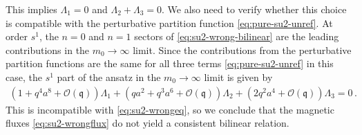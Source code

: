 \documentclass[11pt, a4paper]{article}
\theoremstyle{definition}
\begin{document}
This implies $ \Lambda_1=0 $ and $ \Lambda_2+\Lambda_3=0 $. We also need to verify whether this choice is compatible with the perturbative partition function \eqref{eq:pure-su2-unref}. At order $ s^1 $, the $ n=0 $ and $ n=1 $ sectors of \eqref{eq:su2-wrong-bilinear} are the leading contributions in the $ m_0\to \infty $ limit. Since the contributions from the perturbative partition functions are the same for all three terms \eqref{eq:pure-su2-unref} in this case, the $ s^1 $ part of the ansatz in the $ m_0 \to \infty $ limit is given by
\begin{align}
    \left( 1+q^4 a^8 + \mathcal{O}(\mathfrak{q}) \right) \Lambda_1 + \left( qa^2 + q^3a^6 + \mathcal{O}(\mathfrak{q}) \right) \Lambda_2 + \left (2q^2 a^4 + \mathcal{O}(\mathfrak{q}) \right) \Lambda_3 = 0 \, .
\end{align}
This is incompatible with \eqref{eq:su2-wrongeq}, so we conclude that the magnetic fluxes \eqref{eq:su2-wrongflux} do not yield a consistent bilinear relation.
\end{document}
